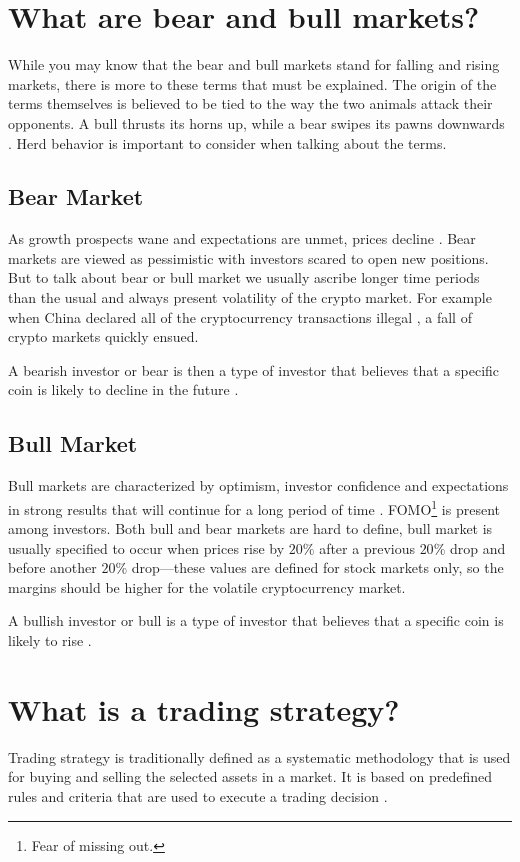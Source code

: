\section{What are bear and bull markets?}
While you may know that the bear and bull markets stand for falling and rising markets, there is more to these terms that must be explained. The origin of the terms themselves is believed to be tied to the way the two animals attack their opponents. A bull thrusts its horns up, while a bear swipes its pawns downwards \cite{investopedia-bull-market}.
Herd behavior is important to consider when talking about the terms.

\subsection*{Bear Market}
As growth prospects wane and expectations are unmet, prices decline \cite{investopedia-bear-market}. Bear markets are viewed as pessimistic with investors scared to open new positions. But to talk about bear or bull market we usually ascribe longer time periods than the usual and always present volatility of the crypto market. For example when China declared all of the cryptocurrency transactions illegal \cite{china-ban}, a fall of crypto markets quickly ensued.

A bearish investor or bear is then a type of investor that believes that a specific coin is likely to decline in the future \cite{investopedia-bull}.

\subsection*{Bull Market}
Bull markets are characterized by optimism, investor confidence and expectations in strong results that will continue for a long period of time \cite{investopedia-bull-market}. FOMO\footnote{Fear of missing out.} is present among investors. Both bull and bear markets are hard to define, bull market is usually specified to occur when prices rise by $20\%$ after a previous $20\%$ drop and before another $20\%$ drop---these values are defined for stock markets only, so the margins should be higher for the volatile cryptocurrency market.

A bullish investor or bull is a type of investor that believes that a specific coin is likely to rise \cite{investopedia-bull}.

\section{What is a trading strategy?}
Trading strategy is traditionally defined as a systematic methodology that is used for buying and selling the selected assets in a market. It is based on predefined rules and criteria that are used to execute a trading decision \cite{investopedia:trading-strategy}.

